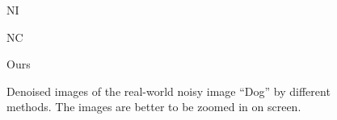 \begin{figure}[t!]
{\begin{minipage}[t]{0.19\textwidth}
{\footnotesize NI}
\end{minipage}
\begin{minipage}[t]{0.19\textwidth}
\centering
{}
{\footnotesize NC}
\end{minipage}
\begin{minipage}[t]{0.19\textwidth}
\centering
{}
{\footnotesize Ours}
\end{minipage}
}\vspace{-3mm}
\caption{Denoised images of the real-world noisy image ``Dog'' \cite{ncwebsite} by different methods. The images are better to be zoomed in on screen.}
    \label{fig3-9}
\end{figure}

